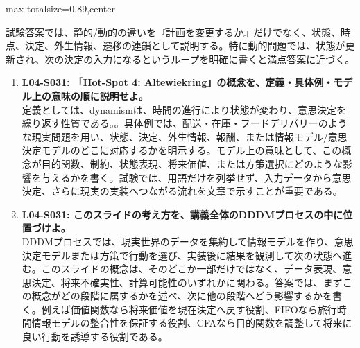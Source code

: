 \begin{minipage}[t]{0.58\textwidth}
\begin{adjustbox}{max totalsize={\textwidth}{0.89\textheight},center}
\begin{minipage}{\textwidth}
試験答案では、静的/動的の違いを『計画を変更するか』だけでなく、状態、時点、決定、外生情報、遷移の連鎖として説明する。特に動的問題では、状態が更新され、次の決定の入力になるというループを明確に書くと満点答案に近づく。\par{}\begin{enumerate}\item \textbf{L04-S031: 「Hot-Spot 4: Altewiekring」の概念を、定義・具体例・モデル上の意味の順に説明せよ。}\\定義としては、dynamismは、時間の進行により状態が変わり、意思決定を繰り返す性質である。。具体例では、配送・在庫・フードデリバリーのような現実問題を用い、状態、決定、外生情報、報酬、または情報モデル/意思決定モデルのどこに対応するかを明示する。モデル上の意味として、この概念が目的関数、制約、状態表現、将来価値、または方策選択にどのような影響を与えるかを書く。試験では、用語だけを列挙せず、入力データから意思決定、さらに現実の実装へつながる流れを文章で示すことが重要である。\item \textbf{L04-S031: このスライドの考え方を、講義全体のDDDMプロセスの中に位置づけよ。}\\DDDMプロセスでは、現実世界のデータを集約して情報モデルを作り、意思決定モデルまたは方策で行動を選び、実装後に結果を観測して次の状態へ進む。このスライドの概念は、そのどこか一部だけではなく、データ表現、意思決定、将来不確実性、計算可能性のいずれかに関わる。答案では、まずこの概念がどの段階に属するかを述べ、次に他の段階へどう影響するかを書く。例えば価値関数なら将来価値を現在決定へ戻す役割、FIFOなら旅行時間情報モデルの整合性を保証する役割、CFAなら目的関数を調整して将来に良い行動を誘導する役割である。\end{enumerate}
\end{minipage}
\end{adjustbox}
\end{minipage}


